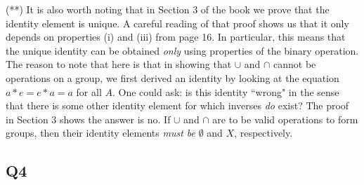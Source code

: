 \documentclass[12pt]{article}
\numberwithin{theorem}{section}
\numberwithin{equation}{section}
\numberwithin{remark}{section}
\numberwithin{definition}{section}
\numberwithin{theorem}{section}
\numberwithin{lemma}{section}
\numberwithin{example}{section}
\begin{document}
\vspace{\baselineskip}

\noindent (**) It is also worth noting that in Section 3 of the book we prove that the identity element is unique. A careful reading of that proof shows us that it only depends on properties (i) and (iii) from page 16. In particular, this means that the unique identity can be obtained \emph{only} using properties of the binary operation. The reason to note that here is that in showing that $\cup$ and $\cap$ cannot be operations on a group, we first derived an identity by looking at the equation $a*e=e*a=a$ for all $A$. One could ask: is this identity ``wrong" in the sense that there is some other identity element for which inverses \emph{do} exist? The proof in Section 3 shows the answer is no. If $\cup$ and $\cap$ are to be valid operations to form groups, then their identity elements \emph{must be} $\emptyset$ and $X$, respectively. 



\subsection{Q4}
\end{document}
